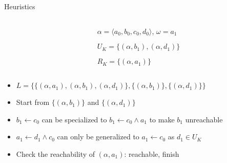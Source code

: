 \documentclass[8pt]{beamer}
\begin{document}
\begin{frame}{Heuristics}
\begin{columns}
\begin{column}{0.6\textwidth}

\end{column}
\begin{column}{0.4\textwidth}
    $\alpha=\langle a_0,b_0,c_0,d_0\rangle$, $\omega=a_1$
    
	$U_K=\{(\alpha,b_1),(\alpha,d_1)\}$
	
	$R_K=\{(\alpha,a_1)\}$
\end{column}
\end{columns}

        \vspace{0.3cm}
        \centering
        
        
        \vspace{0.3cm}
     \begin{itemize}
        \item $L=\{\{(\alpha,a_1),(\alpha,b_1),(\alpha,d_1)\},\{(\alpha,b_1)\},\{(\alpha,d_1)\}\}$
        \item Start from $\{(\alpha,b_1)\}$ and $\{(\alpha,d_1)\}$
        \item $b_1\gets c_0$ can be specialized to $b_1\gets c_0\land a_1$ to make $b_1$ unreachable
        \item $a_1\gets d_1 \land c_0$ can only be generalized to $a_1 \gets c_0$ as $d_1\in U_K$
        \item Check the reachability of $(\alpha,a_1)$: reachable, finish
    \end{itemize}
\end{frame}
\end{document}
